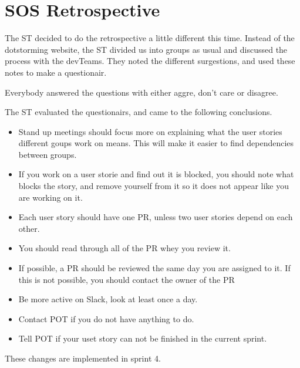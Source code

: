 \section{SOS Retrospective}

The \gls{ST} decided to do the retrospective a little different this time. Instead of the dotstorming website, the \gls{ST} divided us into groups as usual and discussed the process with the \glspl{devTeam}. They noted the different surgestions, and used these notes to make a questionair. 

Everybody answered the questions with either aggre, don't care or disagree. 

The \gls{ST} evaluated the questionairs, and came to the following conclusions. 

\begin{itemize}
    \item Stand up meetings should focus more on explaining what the user stories different goups work on means. This will make it easier to find dependencies between groups. 
    \item If you work on a user storie and find out it is blocked, you should note what blocks the story, and remove yourself from it so it does not appear like you are working on it.
    \item Each user story should have one \gls{PR}, unless two user stories depend on each other. 
    \item You should read through all of the \gls{PR} whey you review it.
    \item If possible, a \gls{PR} should be reviewed the same day you are assigned to it. If this is not possible, you should contact the owner of the \gls{PR}
    \item Be more active on Slack, look at least once a day.
    \item Contact \gls{POT} if you do not have anything to do.
    \item Tell \gls{POT} if your uset story can not be finished in the current sprint. 
\end{itemize}

These changes are implemented in sprint 4. 